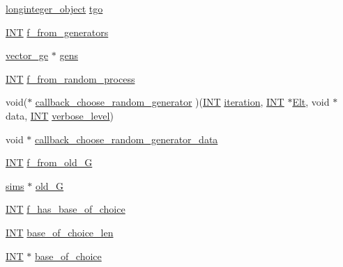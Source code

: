 \begin{DoxyCompactItemize}
\item 
\mbox{\hyperlink{classlonginteger__object}{longinteger\+\_\+object}} \mbox{\hyperlink{classschreier__sims_ab817cde1a270fbb3fef176d433b4b090}{tgo}}
\item 
\mbox{\hyperlink{galois_8h_a09fddde158a3a20bd2dcadb609de11dc}{I\+NT}} \mbox{\hyperlink{classschreier__sims_a19fae3b3be9bf8bedddbef406ab5a5c5}{f\+\_\+from\+\_\+generators}}
\item 
\mbox{\hyperlink{classvector__ge}{vector\+\_\+ge}} $\ast$ \mbox{\hyperlink{classschreier__sims_a3cfa5bb6659aa4aa26079c6f30148570}{gens}}
\item 
\mbox{\hyperlink{galois_8h_a09fddde158a3a20bd2dcadb609de11dc}{I\+NT}} \mbox{\hyperlink{classschreier__sims_a907df2af2fa169317d4d50f2c725fd49}{f\+\_\+from\+\_\+random\+\_\+process}}
\item 
void($\ast$ \mbox{\hyperlink{classschreier__sims_a31b141e23452438d7db65f104ca8e1ee}{callback\+\_\+choose\+\_\+random\+\_\+generator}} )(\mbox{\hyperlink{galois_8h_a09fddde158a3a20bd2dcadb609de11dc}{I\+NT}} \mbox{\hyperlink{classschreier__sims_a11b719a35db207e78f21da7c98d67d18}{iteration}}, \mbox{\hyperlink{galois_8h_a09fddde158a3a20bd2dcadb609de11dc}{I\+NT}} $\ast$\mbox{\hyperlink{simeon_8_c_aec1406935bdb1fee3561fcb840964100}{Elt}}, void $\ast$data, \mbox{\hyperlink{galois_8h_a09fddde158a3a20bd2dcadb609de11dc}{I\+NT}} \mbox{\hyperlink{simeon_8_c_a818073fbcc2f439e7c56952f67386122}{verbose\+\_\+level}})
\item 
void $\ast$ \mbox{\hyperlink{classschreier__sims_ac50eb5360fae2c322a7e4b2af83389b1}{callback\+\_\+choose\+\_\+random\+\_\+generator\+\_\+data}}
\item 
\mbox{\hyperlink{galois_8h_a09fddde158a3a20bd2dcadb609de11dc}{I\+NT}} \mbox{\hyperlink{classschreier__sims_a7e330179ac3705b2a6629ce870bcc144}{f\+\_\+from\+\_\+old\+\_\+G}}
\item 
\mbox{\hyperlink{classsims}{sims}} $\ast$ \mbox{\hyperlink{classschreier__sims_ad7bd24f58d0a1360bc0250cdad2cddf2}{old\+\_\+G}}
\item 
\mbox{\hyperlink{galois_8h_a09fddde158a3a20bd2dcadb609de11dc}{I\+NT}} \mbox{\hyperlink{classschreier__sims_a0e1aca783c403d80863d67fb4fb402d6}{f\+\_\+has\+\_\+base\+\_\+of\+\_\+choice}}
\item 
\mbox{\hyperlink{galois_8h_a09fddde158a3a20bd2dcadb609de11dc}{I\+NT}} \mbox{\hyperlink{classschreier__sims_a12707cc1e744ca9f9f78e6b0b37f55cb}{base\+\_\+of\+\_\+choice\+\_\+len}}
\item 
\mbox{\hyperlink{galois_8h_a09fddde158a3a20bd2dcadb609de11dc}{I\+NT}} $\ast$ \mbox{\hyperlink{classschreier__sims_a48bf8140c25d70a5b0b9de77695f310b}{base\+\_\+of\+\_\+choice}}

\end{DoxyCompactItemize}
